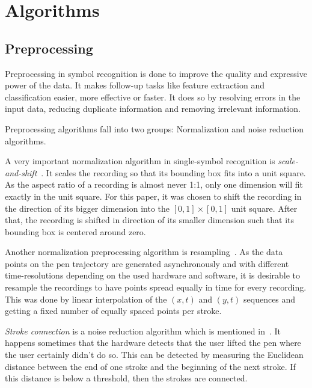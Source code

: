 
\section{Algorithms}
\subsection{Preprocessing}\label{sec:preprocessing}
Preprocessing in symbol recognition is done to improve the quality and
expressive power of the data. It makes follow-up tasks like feature extraction
and classification easier, more effective or faster. It does so by resolving
errors in the input data, reducing duplicate information and removing
irrelevant information.

Preprocessing algorithms fall into two groups: Normalization and noise
reduction algorithms.

A very important normalization algorithm in single-symbol recognition is
\textit{scale-and-shift}~\cite{Thoma:2014}. It scales the recording so that
its bounding box fits into a unit square. As the aspect ratio of a recording is
almost never 1:1, only one dimension will fit exactly in the unit square. For
this paper, it was chosen to shift the recording in the direction of its bigger
dimension into the $[0,1] \times [0,1]$ unit square. After that, the recording
is shifted in direction of its smaller dimension such that its bounding box is
centered around zero.

Another normalization preprocessing algorithm is
resampling~\cite{Guyon91,Manke01}. As the data points on the pen trajectory are
generated asynchronously and with different time-resolutions depending on the
used hardware and software, it is desirable to resample the recordings to have
points spread equally in time for every recording. This was done by linear
interpolation of the $(x,t)$ and $(y,t)$ sequences and getting a fixed number
of equally spaced points per stroke.

\textit{Stroke connection} is a noise reduction algorithm which is mentioned
in~\cite{Tappert90}. It happens sometimes that the hardware detects that the
user lifted the pen where the user certainly didn't do so. This can be detected
by measuring the Euclidean distance between the end of one stroke and the
beginning of the next stroke. If this distance is below a threshold, then the
strokes are connected.

